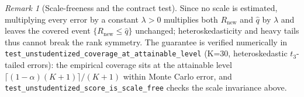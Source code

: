 \documentclass[12pt]{article}
\theoremstyle{definition}
\theoremstyle{remark}
\newtheorem{remark}{Remark}
\newcommand{\Rnew}{R_{\mathrm{new}}}
\begin{document}
\begin{remark}[Scale-freeness and the contract test]
Since no scale is estimated, multiplying every error by a constant $\lambda>0$ multiplies
both $\Rnew$ and $\widehat q$ by $\lambda$ and leaves the covered event
$\{\Rnew\le\widehat q\}$ unchanged; heteroskedasticity and heavy tails thus cannot break the
rank symmetry. The guarantee is verified numerically in
\texttt{test\_unstudentized\_coverage\_at\_attainable\_level} (K=30, heteroskedastic
$t_3$-tailed errors): the empirical coverage sits at the attainable level
$\lceil(1-\alpha)(K+1)\rceil/(K+1)$ within Monte Carlo error, and
\texttt{test\_unstudentized\_score\_is\_scale\_free} checks the scale invariance above.
\end{remark}
\end{document}
